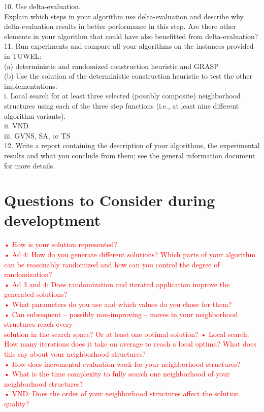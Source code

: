 {10. Use delta-evaluation.\\
Explain which steps in your algorithm use delta-evaluation and describe
why delta-evaluation results in better performance in this step. Are there other elements in your
algorithm that could have also benefitted from delta-evaluation?\\
11. Run experiments and compare all your algorithms on the instances provided in TUWEL:\\
(a) deterministic and randomized construction heuristic and GRASP\\
(b) Use the solution of the deterministic construction heuristic to test the other implementations:\\
i. Local search for at least three selected (possibly composite) neighborhood structures using
each of the three step functions (i.e., at least nine different algorithm variants).\\
ii. VND\\
iii. GVNS, SA, or TS\\
12. Write a report containing the description of your algorithms, the experimental results and what
you conclude from them; see the general information document for more details.}

\pagebreak

\section{Questions to Consider during developtment}

\textcolor{red}{
• How is your solution represented?\\
• Ad 4: How do you generate different solutions? Which parts of your algorithm can be reasonably
randomized and how can you control the degree of randomization?\\
• Ad 3 and 4: Does randomization and iterated application improve the generated solutions?\\
• What parameters do you use and which values do you chose for them?\\
• Can subsequent – possibly non-improving – moves in your neighborhood structures reach every\\
solution in the search space? Or at least one optimal solution?
• Local search: How many iterations does it take on average to reach a local optima? What does
this say about your neighborhood structures?\\
• How does incremental evaluation work for your neighborhood structures?\\
• What is the time complexity to fully search one neighborhood of your neighborhood structures?\\
• VND: Does the order of your neighborhood structures affect the solution quality?}